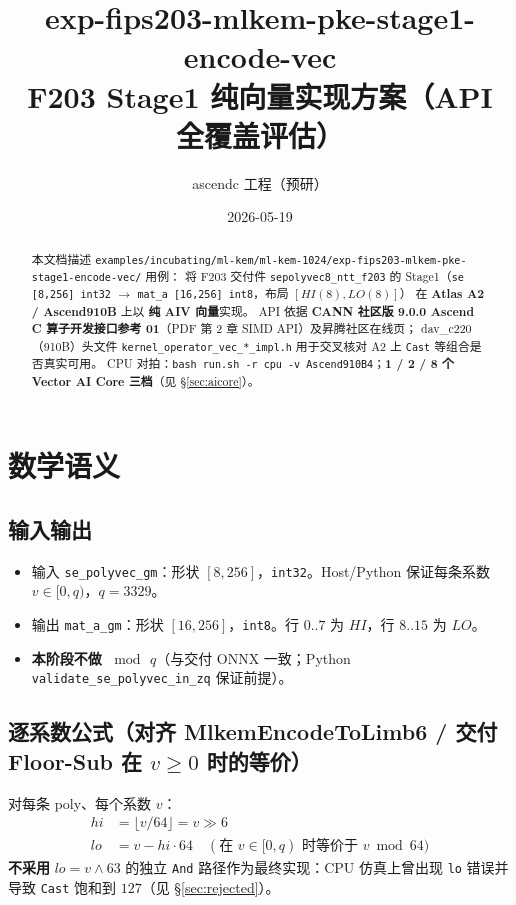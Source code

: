 \documentclass[UTF8,a4paper,11pt]{ctexart}
\title{exp-fips203-mlkem-pke-stage1-encode-vec\\F203 Stage1 纯向量实现方案（API 全覆盖评估）}
\author{ascendc 工程（预研）}
\date{2026-05-19}
\begin{document}
\maketitle

\begin{abstract}
本文档描述 \texttt{examples/incubating/ml-kem/ml-kem-1024/exp-fips203-mlkem-pke-stage1-encode-vec/} 用例：
将 F203 交付件 \texttt{sepolyvec8\_ntt\_f203} 的 Stage1（\texttt{se [8,256] int32} $\rightarrow$ \texttt{mat\_a [16,256] int8}，布局 $[HI(8),LO(8)]$）
在 \textbf{Atlas A2 / Ascend910B} 上以 \textbf{纯 AIV 向量}实现。
API 依据 \textbf{CANN 社区版 9.0.0 Ascend C 算子开发接口参考 01}（PDF 第 2 章 SIMD API）及昇腾社区在线页；
dav\_c220（910B）头文件 \texttt{kernel\_operator\_vec\_*\_impl.h} 用于交叉核对 A2 上 \texttt{Cast} 等组合是否真实可用。
CPU 对拍：\texttt{bash run.sh -r cpu -v Ascend910B4}；\textbf{1 / 2 / 8 个 Vector AI Core 三档}（见 §\ref{sec:aicore}）。
\end{abstract}

\tableofcontents
\newpage

\section{数学语义}

\subsection{输入输出}
\begin{itemize}
  \item 输入 \texttt{se\_polyvec\_gm}：形状 $[8,256]$，\texttt{int32}。Host/Python 保证每条系数 $v \in [0,q)$，$q=3329$。
  \item 输出 \texttt{mat\_a\_gm}：形状 $[16,256]$，\texttt{int8}。行 $0..7$ 为 $HI$，行 $8..15$ 为 $LO$。
  \item \textbf{本阶段不做 $\bmod\,q$}（与交付 ONNX 一致；Python \texttt{validate\_se\_polyvec\_in\_zq} 保证前提）。
\end{itemize}

\subsection{逐系数公式（对齐 MlkemEncodeToLimb6 / 交付 Floor-Sub 在 $v\ge0$ 时的等价）}
对每条 poly、每个系数 $v$：
\begin{align}
  hi &= \lfloor v / 64 \rfloor = v \gg 6 \\
  lo &= v - hi \cdot 64 \quad (\text{在 } v\in[0,q) \text{ 时等价于 } v \bmod 64)
\end{align}
\textbf{不采用} $lo = v \land 63$ 的独立 \texttt{And} 路径作为最终实现：CPU 仿真上曾出现 \texttt{lo} 错误并导致 \texttt{Cast} 饱和到 $127$（见 §\ref{sec:rejected}）。
\end{document}
